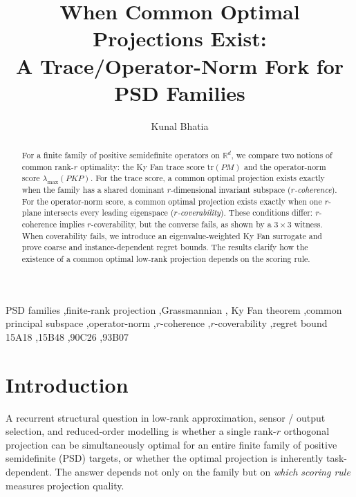 \documentclass[final,3p,times]{elsarticle}
\newcommand{\tr}{\mathrm{tr}}
\newcommand{\R}{\mathbb{R}}
\begin{document}
\begin{frontmatter}

\title{When Common Optimal Projections Exist:\\
       A Trace/Operator-Norm Fork for PSD Families}

\author{Kunal Bhatia}
\address{Independent Researcher, Heidelberg, Germany\\
ORCID: \href{https://orcid.org/0009-0007-4447-6325}{0009-0007-4447-6325}}

\begin{abstract}
For a finite family of positive semidefinite operators on $\R^d$, we
compare two notions of common rank-$r$ optimality: the Ky Fan trace
score $\tr(PM)$ and the operator-norm score $\lambda_{\max}(PKP)$.
For the trace score, a common optimal projection exists exactly when
the family has a shared dominant $r$-dimensional invariant subspace
(\emph{$r$-coherence}).
For the operator-norm score, a common optimal projection exists exactly
when one $r$-plane intersects every leading eigenspace
(\emph{$r$-coverability}).
These conditions differ: $r$-coherence implies $r$-coverability, but
the converse fails, as shown by a $3\times 3$ witness.
When coverability fails, we introduce an eigenvalue-weighted Ky Fan
surrogate and prove coarse and instance-dependent regret bounds.
The results clarify how the existence of a common optimal low-rank
projection depends on the scoring rule.
\end{abstract}

\begin{keyword}
PSD families \sep finite-rank projection \sep Grassmannian \sep
Ky Fan theorem \sep common principal subspace \sep operator-norm
\sep $r$-coherence \sep $r$-coverability \sep regret bound
\MSC[2020] 15A18 \sep 15B48 \sep 90C26 \sep 93B07
\end{keyword}

\end{frontmatter}

\section{Introduction}

A recurrent structural question in low-rank approximation, sensor /
output selection, and reduced-order modelling is whether a single
rank-$r$ orthogonal projection can be simultaneously optimal for an
entire finite family of positive semidefinite (PSD) targets, or whether
the optimal projection is inherently task-dependent.
The answer depends not only on the family but on \emph{which scoring
rule} measures projection quality.
\end{document}
